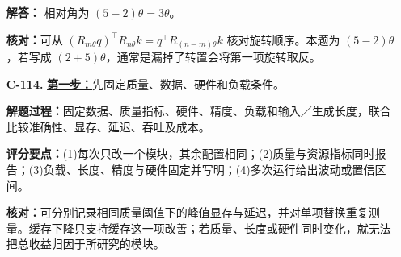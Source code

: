 \begin{enumerate}[label={},leftmargin=4.8em,itemsep=4pt]
\textbf{解答：} 相对角为 $(5-2)\theta=3\theta$。\par\textbf{核对：}可从 $(R_{m\theta}q)^\top R_{n\theta}k=q^\top R_{(n-m)\theta}k$ 核对旋转顺序。本题为 $(5-2)\theta$，若写成 $(2+5)\theta$，通常是漏掉了转置会将第一项旋转取反。
\item[\textbf{C-114.}] \leavevmode{}\label{solution:C-114}\label{solution:architecture-fair-comparison}\hyperref[exercise:architecture-fair-comparison]{\textbf{第一步：}}先固定质量、数据、硬件和负载条件。\par\nobreak\textbf{解题过程：}固定数据、质量指标、硬件、精度、负载和输入／生成长度，联合比较准确性、显存、延迟、吞吐及成本。\par\textbf{评分要点：}(1)每次只改一个模块，其余配置相同；(2)质量与资源指标同时报告；(3)负载、长度、精度与硬件固定并写明；(4)多次运行给出波动或置信区间。\par\textbf{核对：}可分别记录相同质量阈值下的峰值显存与延迟，并对单项替换重复测量。缓存下降只支持缓存这一项改善；若质量、长度或硬件同时变化，就无法把总收益归因于所研究的模块。
\end{enumerate}

